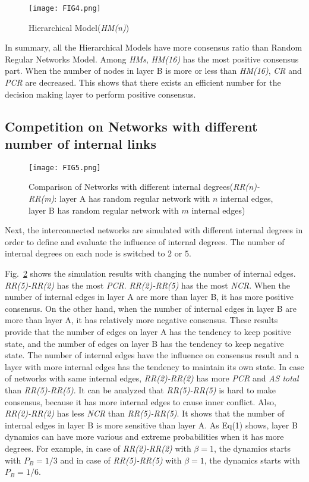 \documentclass[english]{cccconf}
\begin{document}
\begin{figure}[!htb]
	\centering
	\texttt{[image: FIG4.png]}
	\caption{Hierarchical Model(\textit{HM(n)})}
	\label{Fig4}
\end{figure}

In summary, all the Hierarchical Models have more consensus ratio than Random Regular Networks Model. Among \textit{HMs}, \textit{HM(16)} has the most positive consensus part. When the number of nodes in layer B is more or less than \textit{HM(16)}, \textit{CR} and \textit{PCR} are decreased. This shows that there exists an efficient number for the decision making layer to perform positive consensus.  

\subsection{Competition on Networks with different number of internal links}
\begin{figure}[!htb]
	\centering
	\texttt{[image: FIG5.png]}
	\caption{Comparison of Networks with different internal degrees(\textit{RR(n)-RR(m)}: layer A has random regular network with $n$ internal edges, layer B has random regular network with $m$ internal edges)}
	\label{Fig5}
\end{figure}
Next, the interconnected networks are simulated with different internal degrees in order to define and evaluate the influence of internal degrees. The number of internal degrees on each node is switched to $2$ or $5$.

Fig.~\ref{Fig5} shows the simulation results with changing the number of internal edges. \textit{RR(5)-RR(2)} has the most \textit{PCR}. \textit{RR(2)-RR(5)} has the most \textit{NCR}. When the number of internal edges in layer A are more than layer B, it has more positive consensus. On the other hand, when the number of internal edges in layer B are more than layer A, it has relatively more negative consensus. These results provide that the number of edges on layer A has the tendency to keep positive state, and the number of edges on layer B has the tendency to keep negative state. The number of internal edges have the influence on consensus result and a layer with more internal edges has the tendency to maintain its own state. In case of networks with same internal edges, \textit{RR(2)-RR(2)} has more \textit{PCR} and \textit{AS total} than \textit{RR(5)-RR(5)}. It can be analyzed that \textit{RR(5)-RR(5)} is hard to make consensus, because it has more internal edges to cause inner conflict. Also, \textit{RR(2)-RR(2)} has less \textit{NCR} than \textit{RR(5)-RR(5)}. It shows that the number of internal edges in layer B is more sensitive than layer A. As Eq(1) shows, layer B dynamics can have more various and extreme probabilities when it has more degrees. For example, in case of \textit{RR(2)-RR(2)} with $\beta = 1$, the dynamics starts with $P_B=1/3$ and in case of \textit{RR(5)-RR(5)} with $\beta = 1$, the dynamics starts with $P_B=1/6$.    
\end{document}
